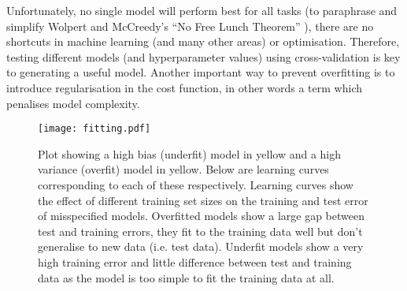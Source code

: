 Unfortunately, no single model will perform best for all tasks (to paraphrase and simplify Wolpert and McCreedy's ``No Free Lunch Theorem'' \citep{Wolpert1996}),
there are no shortcuts in machine learning (and many other areas) or optimisation.  Therefore, testing different models (and hyperparameter values) using
cross-validation is key to generating a useful model.  Another important way to prevent overfitting is to introduce regularisation in the cost function, in other
words a term which penalises model complexity.

\begin{figure}[h]
    \texttt{[image: fitting.pdf]}
    \caption{Plot showing a high bias (underfit) model in yellow and a high variance (overfit) model in yellow.
        Below are learning curves corresponding to each of these respectively.
        Learning curves show the effect of different training set sizes on the training and test error of misspecified models.
        Overfitted models show a large gap between test and training errors, they fit to the training data well but don't generalise
        to new data (i.e. test data).
        Underfit models show a very high training error and little difference between test and training data as the model is too simple
        to fit the training data at all.
    }
    \label{fig:fitting}
\end{figure}





